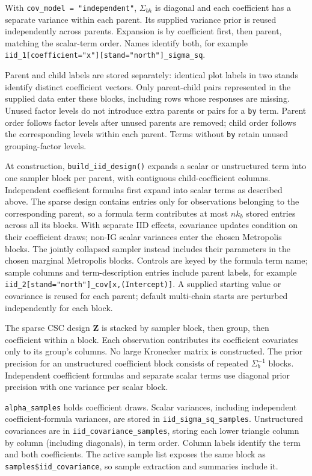 \documentclass[11pt]{article}
\newcommand{\bZ}{\bm{Z}}
\begin{document}
With \texttt{cov\_model = "independent"}, $\Sigma_{bh}$ is diagonal and each coefficient has a separate variance within each parent. Its supplied variance prior is reused independently across parents. Expansion is by coefficient first, then parent, matching the scalar-term order. Names identify both, for example \texttt{iid\_1[coefficient="x"][stand="north"]\_sigma\_sq}.

Parent and child labels are stored separately: identical plot labels in two stands identify distinct coefficient vectors. Only parent-child pairs represented in the supplied data enter these blocks, including rows whose responses are missing. Unused factor levels do not introduce extra parents or pairs for a \texttt{by} term. Parent order follows factor levels after unused parents are removed; child order follows the corresponding levels within each parent. Terms without \texttt{by} retain unused grouping-factor levels.

At construction, \texttt{build\_iid\_design()} expands a scalar or unstructured term into one sampler block per parent, with contiguous child-coefficient columns. Independent coefficient formulas first expand into scalar terms as described above. The sparse design contains entries only for observations belonging to the corresponding parent, so a formula term contributes at most $n k_b$ stored entries across all its blocks. With separate IID effects, covariance updates condition on their coefficient draws; non-IG scalar variances enter the chosen Metropolis blocks. The jointly collapsed sampler instead includes their parameters in the chosen marginal Metropolis blocks. Controls are keyed by the formula term name; sample columns and term-description entries include parent labels, for example \texttt{iid\_2[stand="north"]\_cov[x,(Intercept)]}. A supplied starting value or covariance is reused for each parent; default multi-chain starts are perturbed independently for each block.

The sparse CSC design $\bZ$ is stacked by sampler block, then group, then coefficient within a block. Each observation contributes its coefficient covariates only to its group's columns. No large Kronecker matrix is constructed. The prior precision for an unstructured coefficient block consists of repeated $\Sigma_b^{-1}$ blocks. Independent coefficient formulas and separate scalar terms use diagonal prior precision with one variance per scalar block.

\texttt{alpha\_samples} holds coefficient draws. Scalar variances, including independent coefficient-formula variances, are stored in \texttt{iid\_sigma\_sq\_samples}. Unstructured covariances are in \texttt{iid\_covariance\_samples}, storing each lower triangle column by column (including diagonals), in term order. Column labels identify the term and both coefficients. The active sample list exposes the same block as \texttt{samples\$iid\_covariance}, so sample extraction and summaries include it.
\end{document}
